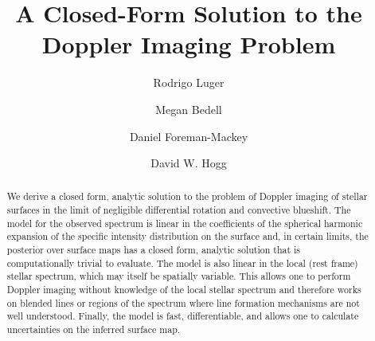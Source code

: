 \documentclass[modern]{aastex62}
\begin{document}
\title{A Closed-Form Solution to the Doppler Imaging Problem}

\author[0000-0002-0296-3826]{Rodrigo Luger}
%
\author{Megan Bedell}
%
\author{Daniel Foreman-Mackey}
%
\author{David W. Hogg}

\begin{abstract} 
We derive a closed form, analytic solution to the problem of Doppler imaging
of stellar surfaces in the limit of negligible differential rotation and
convective blueshift. The model for the observed spectrum is linear in the
coefficients of the spherical harmonic expansion of the specific intensity
distribution on the surface and, in certain limits, the posterior over surface maps
has a closed form, analytic solution that is computationally trivial to
evaluate. The model is also linear in the local (rest frame) stellar spectrum,
which may itself be spatially variable. This allows one to perform Doppler
imaging without knowledge of the local stellar spectrum and therefore works
on blended lines or regions of the spectrum where line formation mechanisms
are not well understood. Finally, the model is fast, differentiable, and allows
one to calculate uncertainties on the inferred surface map.
%
\href{https://github.com/rodluger/paparazzi}{\color{linkcolor}\faGithub}
\end{abstract}

%
\end{document}

